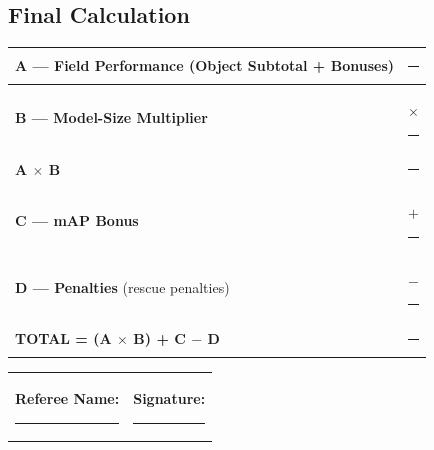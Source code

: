 \documentclass[a4]{article}
\begin{document}
\subsection*{Final Calculation}

\begin{table}[H]
\centering
\begin{tabular}{|l|r|}
\hline
\textbf{A --- Field Performance} (Object Subtotal + Bonuses) & \rule{3cm}{0.4pt} \\
\hline
\textbf{B --- Model-Size Multiplier} & $\times$ \rule{2cm}{0.4pt} \\
\hline
\textbf{A $\times$ B} & \rule{3cm}{0.4pt} \\
\hline
\textbf{C --- mAP Bonus} & $+$ \rule{2cm}{0.4pt} \\
\hline
\textbf{D --- Penalties} (rescue penalties) & $-$ \rule{2cm}{0.4pt} \\
\hline
\textbf{TOTAL = (A $\times$ B) + C $-$ D} & \rule{3cm}{0.4pt} \\
\hline
\end{tabular}
\end{table}

\vspace{1em}

\begin{tabular}{p{6cm}p{6cm}}
\textbf{Referee Name:} \rule{5cm}{0.4pt} & \textbf{Signature:} \rule{5cm}{0.4pt} \\
\end{tabular}
\end{document}

